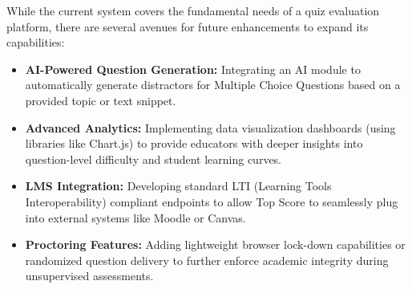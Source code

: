While the current system covers the fundamental needs of a quiz evaluation platform, there are several avenues for future enhancements to expand its capabilities:
\begin{itemize}
    \item \textbf{AI-Powered Question Generation:} Integrating an AI module to automatically generate distractors for Multiple Choice Questions based on a provided topic or text snippet.
    \item \textbf{Advanced Analytics:} Implementing data visualization dashboards (using libraries like Chart.js) to provide educators with deeper insights into question-level difficulty and student learning curves.
    \item \textbf{LMS Integration:} Developing standard LTI (Learning Tools Interoperability) compliant endpoints to allow Top Score to seamlessly plug into external systems like Moodle or Canvas.
    \item \textbf{Proctoring Features:} Adding lightweight browser lock-down capabilities or randomized question delivery to further enforce academic integrity during unsupervised assessments.
\end{itemize}
